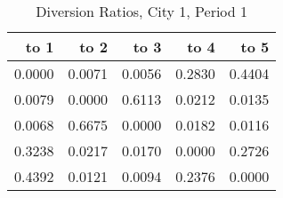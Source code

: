 \begin{table}[H]
    \centering
    \caption{Diversion Ratios, City 1, Period 1}
    \label{tab:q9_diversion_city1_period1}
\begin{tabular}{rrrrr}
\toprule
to 1 & to 2 & to 3 & to 4 & to 5 \\
\midrule
\midrule
0.0000 & 0.0071 & 0.0056 & 0.2830 & 0.4404 \\
0.0079 & 0.0000 & 0.6113 & 0.0212 & 0.0135 \\
0.0068 & 0.6675 & 0.0000 & 0.0182 & 0.0116 \\
0.3238 & 0.0217 & 0.0170 & 0.0000 & 0.2726 \\
0.4392 & 0.0121 & 0.0094 & 0.2376 & 0.0000 \\
\bottomrule
\bottomrule
\end{tabular}

\end{table}
